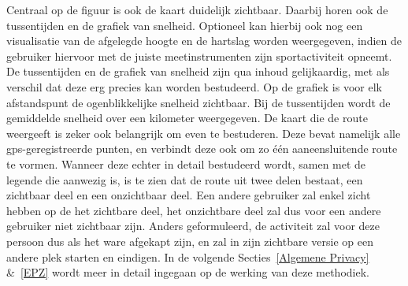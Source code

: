 Centraal op de figuur is ook de kaart duidelijk zichtbaar. Daarbij horen ook de
tussentijden en de grafiek van snelheid. Optioneel kan hierbij ook nog een
visualisatie van de afgelegde hoogte en de hartslag worden weergegeven, indien
de gebruiker hiervoor met de juiste meetinstrumenten zijn sportactiviteit
opneemt. De tussentijden en de grafiek van snelheid zijn qua inhoud
gelijkaardig, met als verschil dat deze erg precies kan worden bestudeerd. Op
de grafiek is voor elk afstandspunt de ogenblikkelijke snelheid zichtbaar. Bij
de tussentijden wordt de gemiddelde snelheid over een kilometer weergegeven. De
kaart die de route weergeeft is zeker ook belangrijk om even te bestuderen.
Deze bevat namelijk alle gps-geregistreerde punten, en verbindt deze ook om zo
één aaneensluitende route te vormen. Wanneer deze echter in detail bestudeerd
wordt, samen met de legende die aanwezig is, is te zien dat de route uit twee
delen bestaat, een zichtbaar deel en een onzichtbaar deel. Een andere gebruiker
zal enkel zicht hebben op de het zichtbare deel, het onzichtbare deel zal dus
voor een andere gebruiker niet zichtbaar zijn. Anders geformuleerd, de
activiteit zal voor deze persoon dus als het ware afgekapt zijn, en zal in zijn
zichtbare versie op een andere plek starten en eindigen. In de volgende
Secties~\ref{Algemene Privacy} \&~\ref{EPZ} wordt meer in detail ingegaan op de
werking van deze methodiek.

